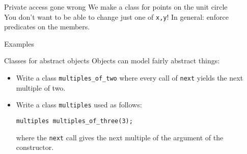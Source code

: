 \begin{block}{Private access gone wrong}
  \label{sl:privatenogood}
  We make a class for points on the unit circle\\
  You don't want to be able to change just one of \lstinline{x,y}!
  In general: enforce predicates on the members.
\end{block}

\begin{comment}
  \Level 1 {Accessors}

  It is a good idea to keep data members private, and use accessor
  functions.

  \begin{exercise}
    \label{ex:geom:twoconstruct}
    Write a \lstinline{Point} class that has two constructors:
    \begin{lstlisting}
      class Point {
        private:
        // data members
        public:
        Point( float x,float y ) { /* ... */ };
        Point( float r,float theta ) { /* ... */ };
        float get_x() { /* ... */ };
        float get_y() { /* ... */ };
        float get_r() { /* ... */ };
        float get_theta() { /* ... */ };
      };
    \end{lstlisting}
    Use $r,\theta$ for the private variables, do not store $x,y$.
  \end{exercise}
\end{comment}

 {Examples}

\begin{block}{Classes for abstract objects}
  \label{sl:intstream}
  Objects can model fairly abstract things:
\end{block}

\begin{exercise}
  \begin{itemize}
  \item
    Write a class \lstinline{multiples_of_two} where every call of
    \lstinline{next} yields the next multiple of two. 
  \item Write a class \lstinline{multiples} used as follows:
\begin{lstlisting}
multiples multiples_of_three(3);      
\end{lstlisting}
  where the \lstinline{next} call gives the next multiple of the
  argument of the constructor.
  \end{itemize}
\end{exercise}


